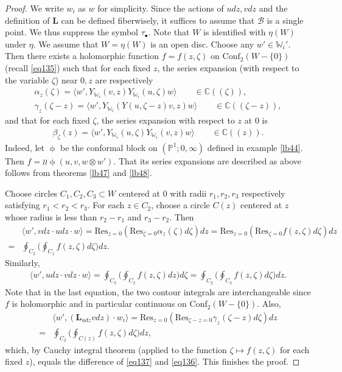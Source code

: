 \documentclass[12pt,b5paper,notitlepage]{report}
\theoremstyle{definition}
\theoremstyle{plain}
\newcommand{\mc}{\mathcal}
\newcommand{\Conf}{\mathrm{Conf}}
\newcommand{\Res}{\mathrm{Res}}
\newcommand{\bk}[1]{\langle {#1}\rangle}
\newcommand{\mbf}{\mathbf}
\newcommand{\blt}{\bullet}
\newcommand{\Wbb}{\mathbb W}
\newcommand{\Cbb}{\mathbb C}
\newcommand{\Pbb}{\mathbb P}
\numberwithin{equation}{section}
\begin{document}
\begin{proof}
We write $w_i$ as $w$ for simplicity. Since the actions of $udz,vdz$ and the definition of $\mbf L$ can be defined fiberwisely, it suffices to assume that $\mc B$ is a single point. We thus suppress the symbol $\tau_\blt$. Note that $W$ is identified with $\eta(W)$ under $\eta$. We assume that $W=\eta(W)$ is an open disc. Choose any $w'\in\Wbb_i'$. Then there exists a holomorphic function $f=f(z,\zeta)$ on $\Conf_2(W-\{0\})$ (recall \eqref{eq135}) such that for each fixed $z$, the series expansion (with respect to the variable $\zeta$) near $0,z$ are respectively
\begin{gather*}
\alpha_z(\zeta)=\bk{w',Y_{\Wbb_i}(v,z)Y_{\Wbb_i}(u,\zeta)w}\qquad\in\Cbb((\zeta)),\\
\gamma_z(\zeta-z)=\bk{w',Y_{\Wbb_i}(Y(u,\zeta-z)v,z)w}\qquad\in\Cbb((\zeta-z)),
\end{gather*}
and that for each fixed $\zeta$, the series expansion with respect to $z$ at $0$ is
\begin{align*}
\beta_\zeta(z)=\bk{w',Y_{\Wbb_i}(u,\zeta)Y_{\Wbb_i}(v,z)w}\qquad\in\Cbb((z)).
\end{align*}
Indeed, let $\upphi$ be the conformal block on $(\Pbb^1;0,\infty)$ defined in example \ref{lb44}. Then $f=\wr\wr\upphi(u,v,w\otimes w')$. That its series expansions are described as above follows from theorems \ref{lb47} and \ref{lb48}.



Choose circles $C_1,C_2,C_3\subset W$ centered at $0$ with radii $r_1,r_2,r_3$ respectively satisfying $r_1<r_2<r_3$. For each $z\in C_2$, choose a circle $C(z)$ centered at $z$ whose radius is less than $r_2-r_1$ and $r_3-r_2$. Then 
\begin{align}
&\bk{w',vdz\cdot udz\cdot w}=\Res_{z=0}(\Res_{\zeta=0}\alpha_z(\zeta)d\zeta)dz=\Res_{z=0}(\Res_{\zeta=0}f(z,\zeta)d\zeta)dz\nonumber\\
=&\oint_{C_2}\Bigg(\oint_{C_1}f(z,\zeta)d\zeta\Bigg)dz.\label{eq136}
\end{align}
Similarly,
\begin{align}
\bk{w',udz\cdot vdz\cdot w}=\oint_{C_3}\Bigg(\oint_{C_2}f(z,\zeta)dz\Bigg)d\zeta=\oint_{C_2}\Bigg(\oint_{C_3}f(z,\zeta)d\zeta\Bigg)dz.\label{eq137}
\end{align}
Note that in the last equation, the two contour integrals are interchangeable since $f$ is holomorphic and in particular continuous on $\Conf_2(W-\{0\})$. Also, 
\begin{align*}
&\bk{w',(\mbf L_{udz}vdz)\cdot w_i}=\Res_{z=0}(\Res_{\zeta-z=0}\gamma_z(\zeta-z)d\zeta)dz\nonumber\\
=&\oint_{C_2}\Bigg(\oint_{C(z)}f(z,\zeta)d\zeta \Bigg)dz,
\end{align*}
which, by Cauchy integral theorem (applied to the function $\zeta\mapsto f(z,\zeta)$ for each fixed $z$), equals the difference of \eqref{eq137} and \eqref{eq136}. This finishes the proof.
\end{proof}
\end{document}
